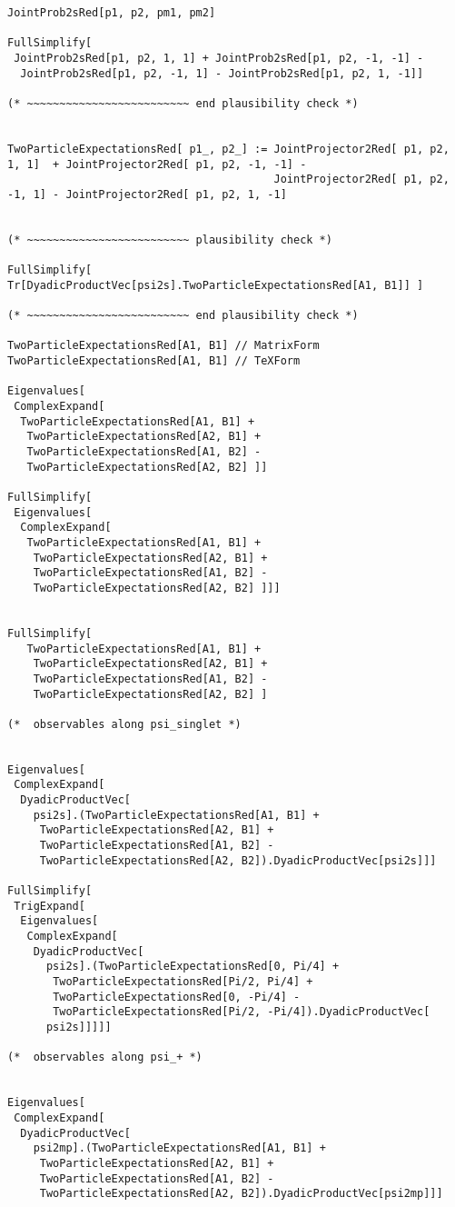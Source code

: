 \documentclass[%
 showpacs,
 showkeys,
 preprintnumbers,
 amsmath,amssymb,
 aps,
  pra,
  longbibliography,
 floatfix,
 ]{revtex4-1}
\begin{document}
{\begin{lstlisting}[backgroundcolor=\color{yellow!10},framerule=0pt,breaklines=true, frame=tb]
JointProb2sRed[p1, p2, pm1, pm2]

FullSimplify[
 JointProb2sRed[p1, p2, 1, 1] + JointProb2sRed[p1, p2, -1, -1] -
  JointProb2sRed[p1, p2, -1, 1] - JointProb2sRed[p1, p2, 1, -1]]

(* ~~~~~~~~~~~~~~~~~~~~~~~~~ end plausibility check *)


TwoParticleExpectationsRed[ p1_, p2_] := JointProjector2Red[ p1, p2, 1, 1]  + JointProjector2Red[ p1, p2, -1, -1] -
                                         JointProjector2Red[ p1, p2, -1, 1] - JointProjector2Red[ p1, p2, 1, -1]


(* ~~~~~~~~~~~~~~~~~~~~~~~~~ plausibility check *)

FullSimplify[ Tr[DyadicProductVec[psi2s].TwoParticleExpectationsRed[A1, B1]] ]

(* ~~~~~~~~~~~~~~~~~~~~~~~~~ end plausibility check *)

TwoParticleExpectationsRed[A1, B1] // MatrixForm
TwoParticleExpectationsRed[A1, B1] // TeXForm

Eigenvalues[
 ComplexExpand[
  TwoParticleExpectationsRed[A1, B1] +
   TwoParticleExpectationsRed[A2, B1] +
   TwoParticleExpectationsRed[A1, B2] -
   TwoParticleExpectationsRed[A2, B2] ]]

FullSimplify[
 Eigenvalues[
  ComplexExpand[
   TwoParticleExpectationsRed[A1, B1] +
    TwoParticleExpectationsRed[A2, B1] +
    TwoParticleExpectationsRed[A1, B2] -
    TwoParticleExpectationsRed[A2, B2] ]]]


FullSimplify[
   TwoParticleExpectationsRed[A1, B1] +
    TwoParticleExpectationsRed[A2, B1] +
    TwoParticleExpectationsRed[A1, B2] -
    TwoParticleExpectationsRed[A2, B2] ]

(*  observables along psi_singlet *)


Eigenvalues[
 ComplexExpand[
  DyadicProductVec[
    psi2s].(TwoParticleExpectationsRed[A1, B1] +
     TwoParticleExpectationsRed[A2, B1] +
     TwoParticleExpectationsRed[A1, B2] -
     TwoParticleExpectationsRed[A2, B2]).DyadicProductVec[psi2s]]]

FullSimplify[
 TrigExpand[
  Eigenvalues[
   ComplexExpand[
    DyadicProductVec[
      psi2s].(TwoParticleExpectationsRed[0, Pi/4] +
       TwoParticleExpectationsRed[Pi/2, Pi/4] +
       TwoParticleExpectationsRed[0, -Pi/4] -
       TwoParticleExpectationsRed[Pi/2, -Pi/4]).DyadicProductVec[
      psi2s]]]]]

(*  observables along psi_+ *)


Eigenvalues[
 ComplexExpand[
  DyadicProductVec[
    psi2mp].(TwoParticleExpectationsRed[A1, B1] +
     TwoParticleExpectationsRed[A2, B1] +
     TwoParticleExpectationsRed[A1, B2] -
     TwoParticleExpectationsRed[A2, B2]).DyadicProductVec[psi2mp]]]


\end{lstlisting}}
\end{document}
